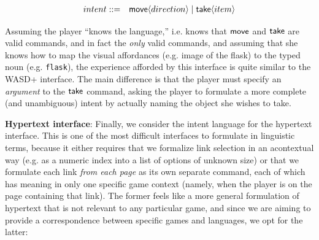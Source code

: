   \begin{eqnarray*}
    intent &::=& \mathsf{move}\langle direction \rangle \mid \mathsf{take}\langle item \rangle
  \end{eqnarray*}

  Assuming the player ``knows the language,'' i.e. knows that $\mathsf{move}$
  and $\mathsf{take}$ are valid commands, and in fact the {\em only} valid
  commands, and assuming that she knows how to map the visual affordances
  (e.g. image of the flask) to the typed noun (e.g. \verb|flask|), the
  experience afforded by this interface is quite similar to the WASD+
  interface. The main difference is that the player must specify an {\em
  argument} to the $\mathsf{take}$ command, asking the player to formulate a
  more complete (and unambiguous) intent by actually naming the object she
  wishes to take.




  \textbf{Hypertext interface}:
  Finally, we consider the intent language for the hypertext interface.
  This is one of the most difficult interfaces to formulate in linguistic
  terms, because it either requires that we formalize link selection in an
  acontextual way (e.g. as a numeric index into a list of options of
  unknown size) or that we formulate each link {\em from each page} as its
  own separate command, each of which has meaning in only one specific game
  context (namely, when the player is on the page containing that link).
  The former feels like a more general formulation of hypertext that is not
  relevant to any particular game, and since we are aiming to provide a
  correspondence between specific games and languages, we opt for the
  latter:


